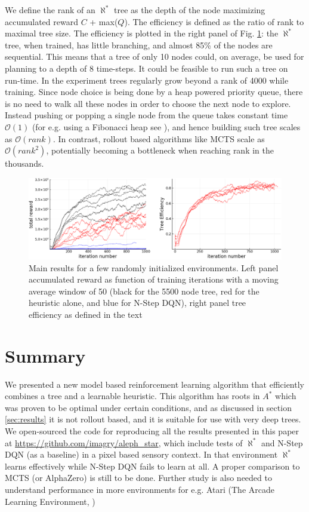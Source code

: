 \documentclass{article}
\newcommand{\alephstar}{$\aleph^*$ }
\newcommand{\astar}{$A^*$ }
\begin{document}
We define the rank of an \alephstar tree as the depth of the node maximizing accumulated reward $C$ + max($Q$). The efficiency is defined as the ratio of rank to maximal tree size. The efficiency is plotted in the right panel of Fig. \ref{fig:results}: the \alephstar tree, when trained, has little branching, and almost 85\% of the nodes are sequential. This means that a tree of only 10 nodes could, on average, be used for planning to a depth of 8 time-steps. It could be feasible to run such a tree on run-time. In the experiment trees regularly grow beyond a rank of 4000 while training. Since node choice is being done by a heap powered priority queue, there is no need to walk all these nodes in order to choose the next node to explore. Instead pushing or popping a single node from the queue takes constant time $\mathcal{O}(1)$ (for e.g. using a Fibonacci heap see \citealt{fredman1987fibonacci}), and hence building such tree scales as $\mathcal{O}(rank)$. In contrast, rollout based algorithms like MCTS scale as $\mathcal{O}(rank^2)$, potentially becoming a bottleneck when reaching rank in the thousands.

\begin{figure}
  \centering
  \includegraphics[width=1.0\textwidth]{images/results.png}
  \caption{Main results for a few randomly initialized environments. Left panel accumulated reward as function of training iterations with a moving average window of 50 (black for the 5500 node tree, red for the heuristic alone, and blue for N-Step DQN), right panel tree efficiency as defined in the text}
  \label{fig:results}
\end{figure}


\section{Summary}
\label{sec:summary}

We presented a new model based reinforcement learning algorithm that efficiently combines a tree and a learnable heuristic. This algorithm has roots in \astar which was proven to be optimal under certain conditions, and as discussed in section \ref{sec:results} it is not rollout based, and it is suitable for use with very deep trees. We open-sourced the code for reproducing all the results presented in this paper at \url{https://github.com/imagry/aleph_star}, which include tests of \alephstar and N-Step DQN (as a baseline) in a pixel based sensory context. In that environment \alephstar learns effectively while N-Step DQN fails to learn at all. A proper comparison to MCTS (or AlphaZero) is still to be done. Further study is also needed to understand performance in more environments for e.g. Atari (The Arcade Learning Environment, \citealt{bellemare2013arcade})


\newpage

{

\small

}
\end{document}
